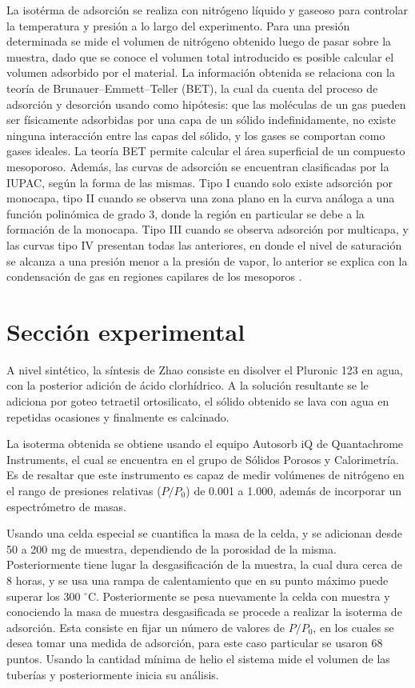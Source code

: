 \documentclass[fleqn,11pt]{SelfArx}
\begin{document}
	La isot\'erma de adsorci\'on se realiza con nitr\'ogeno l\'iquido y gaseoso para controlar la temperatura y presi\'on a lo largo del experimento. Para una presi\'on determinada se mide el volumen de nitr\'ogeno obtenido luego de pasar sobre la muestra, dado que se conoce el volumen total introducido es posible calcular el volumen adsorbido por el material. La informaci\'on obtenida se relaciona con la teor\'ia de Brunauer–Emmett–Teller (BET), la cual da cuenta del proceso de adsorci\'on y desorci\'on usando como hip\'otesis: que las mol\'eculas de un gas pueden ser f\'isicamente adsorbidas por una capa de un s\'olido indefinidamente, no existe ninguna interacci\'on entre las capas del s\'olido, y los gases se comportan como gases ideales. La teor\'ia BET permite calcular el \'area superficial de un compuesto mesoporoso. Adem\'as, las curvas de adsorci\'on se encuentran clasificadas por la IUPAC, seg\'un la forma de las mismas. Tipo I cuando solo existe adsorci\'on por monocapa, tipo II cuando se observa una zona plano en la curva an\'aloga a una funci\'on polin\'omica de grado 3, donde la regi\'on en particular se debe a la formaci\'on de la monocapa. Tipo III cuando se observa adsorci\'on por multicapa, y las curvas tipo IV presentan todas las anteriores, en donde el nivel de saturaci\'on se alcanza a una presi\'on menor a la presi\'on de vapor, lo anterior se explica con la condensaci\'on de gas en  regiones capilares de los mesoporos \cite{sing_2001}.
	
	\section{Secci\'on experimental}
	A nivel sint\'etico, la s\'intesis de Zhao consiste en disolver el Pluronic 123 en agua, con la posterior adici\'on de \'acido clorh\'idrico. A la soluci\'on resultante se le adiciona por goteo tetraetil ortosilicato, el s\'olido obtenido se lava con agua en repetidas ocasiones y finalmente es calcinado.
	
	La isoterma obtenida se obtiene usando el equipo Autosorb iQ de Quantachrome Instruments, el cual se encuentra en el grupo de Sólidos Porosos y Calorimetría. Es de resaltar que este instrumento es capaz de medir vol\'umenes de nitr\'ogeno en el rango de presiones relativas ($P/P_0$) de 0.001 a 1.000, adem\'as de incorporar un espectr\'ometro de masas.
	
	Usando una celda especial se cuantifica la masa de la celda, y se adicionan desde 50 a 200 mg de muestra, dependiendo de la porosidad de la misma. Posteriormente tiene lugar la desgasificaci\'on de la muestra, la cual dura cerca de 8 horas, y se usa una rampa de calentamiento que en su punto m\'aximo puede superar los 300 $^\circ$C. Posteriormente se pesa nuevamente la celda con muestra y conociendo la masa de muestra desgasificada se procede a realizar la isoterma de adsorci\'on. Esta consiste en fijar un n\'umero de valores de $P/P_0$, en los cuales se desea tomar una medida de adsorci\'on, para este caso particular se usaron 68 puntos. Usando la cantidad m\'inima de helio el sistema mide el volumen de las tuber\'ias y posteriormente inicia su an\'alisis.	
	
\end{document}
